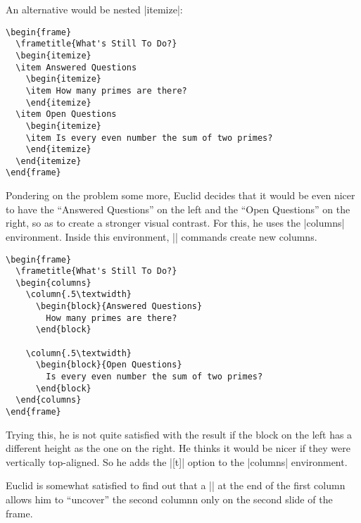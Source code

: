 An alternative would be nested |itemize|:
\begin{verbatim}
\begin{frame}
  \frametitle{What's Still To Do?}
  \begin{itemize}
  \item Answered Questions
    \begin{itemize}
    \item How many primes are there?
    \end{itemize}
  \item Open Questions
    \begin{itemize}
    \item Is every even number the sum of two primes?
    \end{itemize}
  \end{itemize}
\end{frame}
\end{verbatim}
Pondering on the problem some more, Euclid decides that it would be
even nicer to have the ``Answered Questions'' on the left and the
``Open Questions'' on the right, so as to create a stronger visual
contrast. For this, he uses the |columns| environment. Inside this
environment, |\column| commands create new columns.
\begin{verbatim}
\begin{frame}
  \frametitle{What's Still To Do?}
  \begin{columns}
    \column{.5\textwidth}
      \begin{block}{Answered Questions}
        How many primes are there?
      \end{block}

    \column{.5\textwidth}
      \begin{block}{Open Questions}
        Is every even number the sum of two primes?
      \end{block}
  \end{columns}
\end{frame}
\end{verbatim}
Trying this, he is not quite satisfied with the result if the block on
the left has a different height as the one on the right. He thinks it
would be nicer if they were vertically top-aligned. So he adds the
|[t]| option to the |columns| environment. 

Euclid is somewhat satisfied to find out that a |\pause| at the end of
the first column allows him to ``uncover'' the second columnn only on
the second slide of the frame.



